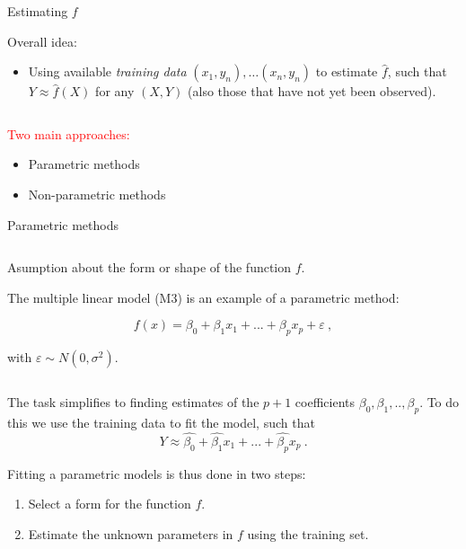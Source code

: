 \documentclass[ignorenonframetext,]{beamer}
\providecommand{\tightlist}{%
  \setlength{\itemsep}{0pt}\setlength{\parskip}{0pt}}
\begin{document}
\begin{frame}{Estimating \(f\)}
\protect\hypertarget{estimating-f}{}

Overall idea:

\begin{itemize}
\tightlist
\item
  Using available \emph{training data} \((x_1,y_n),\ldots (x_n,y_n)\) to
  estimate \(\hat{f}\), such that \(Y\approx \hat{f}(X)\) for any
  \((X,Y)\) (also those that have not yet been observed).
\end{itemize}

\(~\)

\textcolor{red}{Two main approaches:}

\begin{itemize}
\tightlist
\item
  Parametric methods
\item
  Non-parametric methods
\end{itemize}

\end{frame}

\begin{frame}

\begin{block}{Parametric methods}

\(~\)

Asumption about the form or shape of the function \(f\).

The multiple linear model (M3) is an example of a parametric method:

\[f(x) = \beta_0 + \beta_1 x_1 + ... + \beta_p x_p+\varepsilon \ , \]

with \(\varepsilon \sim N(0,\sigma^2)\).

\(~\)

The task simplifies to finding estimates of the \(p+1\) coefficients
\(\beta_0, \beta_1, .. ,\beta_p\). To do this we use the training data
to fit the model, such that
\[Y \approx \hat{\beta_0} + \hat{\beta_1} x_1 + ... + \hat{\beta_p} x_p \ .\]

\end{block}

\end{frame}

\begin{frame}

Fitting a parametric models is thus done in two steps:

\begin{enumerate}
\tightlist
\item
  Select a form for the function \(f\).\\
\item
  Estimate the unknown parameters in \(f\) using the training set.
\end{enumerate}

\end{frame}
\end{document}
